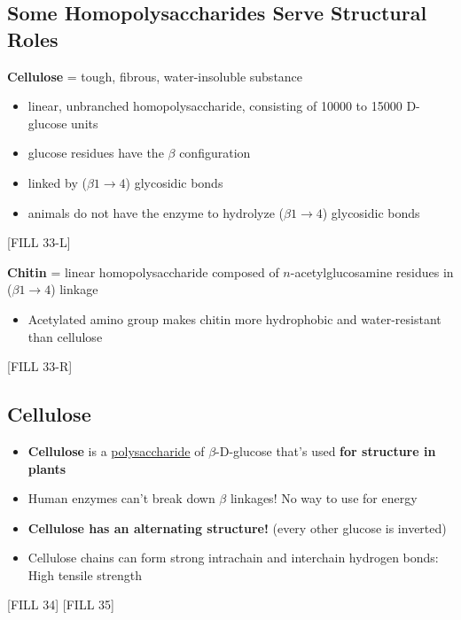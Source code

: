 \documentclass[10pt]{article}
\begin{document}
\subsection*{Some Homopolysaccharides Serve Structural Roles}
\textbf{Cellulose} = tough, fibrous, water-insoluble substance
\begin{itemize}
    \item linear, unbranched homopolysaccharide, consisting of 10000 to 15000 D-glucose units
    \item glucose residues have the $\beta$ configuration
    \item linked by ($\beta 1 \rightarrow 4$) glycosidic bonds
    \item animals do not have the enzyme to hydrolyze ($\beta 1 \rightarrow 4$) glycosidic bonds
\end{itemize}
\begin{center}
    [FILL 33-L]
\end{center}
\textbf{Chitin} = linear homopolysaccharide composed of $n$-acetylglucosamine residues in ($\beta 1 \rightarrow 4$) linkage
\begin{itemize}
    \item Acetylated amino group makes chitin more hydrophobic and water-resistant than cellulose
\end{itemize}
\begin{center}
    [FILL 33-R]
\end{center}

\subsection*{Cellulose}
\begin{itemize}
    \item \textbf{Cellulose} is a \underline{polysaccharide} of $\beta$-D-glucose that's used \textbf{for structure in plants}
    \item Human enzymes can't break down $\beta$ linkages!  No way to use for energy
    \item \textbf{Cellulose has an alternating structure!}  (every other glucose is inverted)
    \item Cellulose chains can form strong intrachain and interchain hydrogen bonds: High tensile strength
\end{itemize}
\begin{center}
    [FILL 34]
    [FILL 35]
\end{center}
\end{document}
